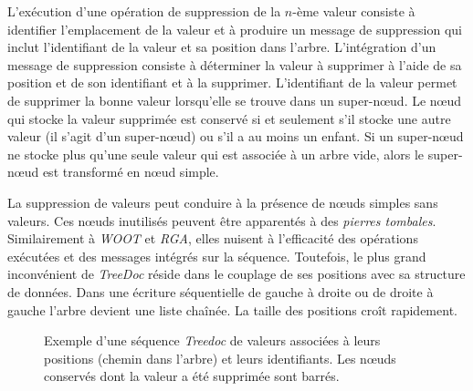 L'exécution d'une opération de suppression de la $n$-ème valeur consiste à identifier l'emplacement de la valeur et à produire un message de suppression qui inclut l'identifiant de la valeur et sa position dans l'arbre.
L'intégration d'un message de suppression consiste à déterminer la valeur à supprimer à l'aide de sa position et de son identifiant et à la supprimer.
L'identifiant de la valeur permet de supprimer la bonne valeur lorsqu'elle se trouve dans un super-nœud.
Le nœud qui stocke la valeur supprimée est conservé si et seulement s'il stocke une autre valeur (il s'agit d'un super-nœud) ou s'il a au moins un enfant.
Si un super-nœud ne stocke plus qu'une seule valeur qui est associée à un arbre vide, alors le super-nœud est transformé en nœud simple.

La suppression de valeurs peut conduire à la présence de nœuds simples sans valeurs.
Ces nœuds inutilisés peuvent être apparentés à des \emph{pierres tombales}.
Similairement à \emph{WOOT} et \emph{RGA}, elles nuisent à l'efficacité des opérations exécutées et des messages intégrés sur la séquence.
Toutefois, le plus grand inconvénient de \emph{TreeDoc} réside dans le couplage de ses positions avec sa structure de données.
Dans une écriture séquentielle de gauche à droite ou de droite à gauche l'arbre devient une liste chaînée.
La taille des positions croît rapidement.

\begin{figure}[tb]
\centering
{}
\caption[Exemple d'une séquence \emph{Treedoc}]{Exemple d'une séquence \emph{Treedoc} de valeurs associées à leurs positions (chemin dans l'arbre) et leurs identifiants.
Les nœuds conservés dont la valeur a été supprimée sont barrés.}\label{fig:treedoc}
\end{figure}

